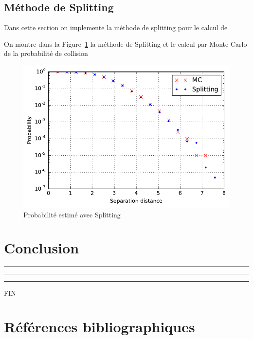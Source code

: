 \documentclass[a4paper, 12pt,twoside]{article}
\numberwithin{equation}{subsection}
\newlength{\mylength}
\begin{document}
	
	\subsection{Méthode de Splitting} %
	\label{sub:methode_de_splitting}
	Dans cette section on implemente la méthode de splitting pour le calcul de %
	
	On montre dans la Figure~\ref{fig:Splitting} la méthode de Splitting et le calcul par Monte Carlo de la probabilité de collision
	\begin{figure}[htbp]
		\centering
		\begin{minipage}[b]{\mylength}
			\includegraphics[width=\textwidth]{Images/Script_10_SplittingvsMC}
			\caption{Probabilité estimé avec Splitting}
			\label{fig:Splitting}
		\end{minipage}
	\end{figure}
	
    
    \clearpage

    \section{Conclusion}


    \begin{center}
        \color{bleu303}

        \rule{0.3\textwidth}{0.2mm}\vspace*{-3.5mm}

        \rule{0.5\textwidth}{0.6mm}\vspace*{-3.8mm}

        \rule{0.3\textwidth}{0.2mm}\vspace*{-1mm}

        \sffamily FIN
    \end{center}
    
     \clearpage
        \section{Références bibliographiques}
        {
        \renewcommand{\section}[2]{} %
        \nocite{*}
        
        
        }

    
\end{document}
